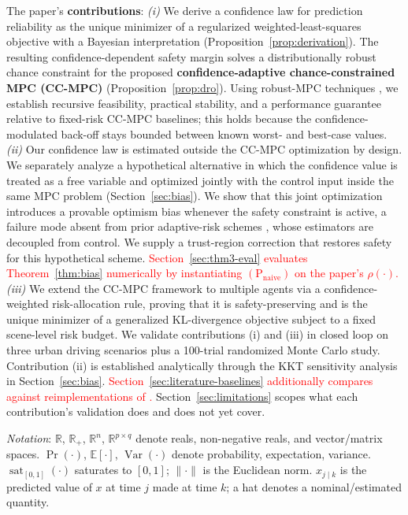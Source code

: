 \documentclass[letterpaper, 10 pt, conference]{ieeeconf}
\begin{document}
The paper's \textbf{contributions}: \emph{(i)} We derive a confidence law for prediction reliability as the unique minimizer of a regularized weighted-least-squares objective with a Bayesian interpretation (Proposition~\ref{prop:derivation}). The resulting confidence-dependent safety margin solves a distributionally robust chance constraint for the proposed \textbf{confidence-adaptive chance-constrained MPC (CC-MPC)} (Proposition~\ref{prop:dro}). Using robust-MPC techniques \cite{rawlings2020model}, we establish recursive feasibility, practical stability, and a performance guarantee relative to fixed-risk CC-MPC baselines; this holds because the confidence-modulated back-off stays bounded between known worst- and best-case values.
\emph{(ii)} Our confidence law is estimated outside the CC-MPC optimization by design. We separately analyze a hypothetical alternative in which the confidence value is treated as a free variable and optimized jointly with the control input inside the same MPC problem (Section~\ref{sec:bias}). We show that this joint optimization introduces a provable optimism bias whenever the safety constraint is active, a failure mode absent from prior adaptive-risk schemes \cite{ma2026sensor,engelaar2025stochastic}, whose estimators are decoupled from control. We supply a trust-region correction that restores safety for this hypothetical scheme. \textcolor{red}{Section~\ref{sec:thm3-eval} evaluates Theorem~\ref{thm:bias} numerically by instantiating $(\mathrm P_{\mathrm{naive}})$ on the paper's $\rho(\cdot)$.}
\emph{(iii)} We extend the CC-MPC framework to multiple agents via a confidence-weighted risk-allocation rule, proving that it is safety-preserving and is the unique minimizer of a generalized KL-divergence objective subject to a fixed scene-level risk budget. We validate contributions (i) and (iii) in closed loop on three urban driving scenarios plus a 100-trial randomized Monte Carlo study. Contribution (ii) is established analytically through the KKT sensitivity analysis in Section~\ref{sec:bias}. \textcolor{red}{Section~\ref{sec:literature-baselines} additionally compares against reimplementations of \cite{ma2026sensor,engelaar2025stochastic}.} Section~\ref{sec:limitations} scopes what each contribution's validation does and does not yet cover.

\textit{Notation}: $\mathbb{R}$, $\mathbb{R}_+$, $\mathbb{R}^n$, $\mathbb{R}^{p\times q}$ denote reals, non-negative reals, and vector/matrix spaces. $\Pr(\cdot)$, $\mathbb{E}[\cdot]$, $\operatorname{Var}(\cdot)$ denote probability, expectation, variance. $\operatorname{sat}_{[0,1]}(\cdot)$ saturates to $[0,1]$; $\|\cdot\|$ is the Euclidean norm. $x_{j\mid k}$ is the predicted value of $x$ at time $j$ made at time $k$; a hat denotes a nominal/estimated quantity.
\end{document}
